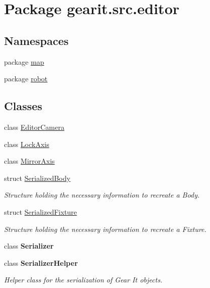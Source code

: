 \hypertarget{namespacegearit_1_1src_1_1editor}{\section{Package gearit.\+src.\+editor}
\label{namespacegearit_1_1src_1_1editor}
}
\subsection*{Namespaces}
\begin{DoxyCompactItemize}
\item 
package \hyperlink{namespacegearit_1_1src_1_1editor_1_1map}{map}
\item 
package \hyperlink{namespacegearit_1_1src_1_1editor_1_1robot}{robot}
\end{DoxyCompactItemize}
\subsection*{Classes}
\begin{DoxyCompactItemize}
\item 
class \hyperlink{classgearit_1_1src_1_1editor_1_1_editor_camera}{Editor\+Camera}
\item 
class \hyperlink{classgearit_1_1src_1_1editor_1_1_lock_axis}{Lock\+Axis}
\item 
class \hyperlink{classgearit_1_1src_1_1editor_1_1_mirror_axis}{Mirror\+Axis}
\item 
struct \hyperlink{structgearit_1_1src_1_1editor_1_1_serialized_body}{Serialized\+Body}
\begin{DoxyCompactList}\small\item\em Structure holding the necessary information to recreate a Body. \end{DoxyCompactList}\item 
struct \hyperlink{structgearit_1_1src_1_1editor_1_1_serialized_fixture}{Serialized\+Fixture}
\begin{DoxyCompactList}\small\item\em Structure holding the necessary information to recreate a Fixture. \end{DoxyCompactList}\item 
class {\bfseries Serializer}
\item 
class {\bfseries Serializer\+Helper}
\begin{DoxyCompactList}\small\item\em Helper class for the serialization of Gear It objects. \end{DoxyCompactList}\end{DoxyCompactItemize}
